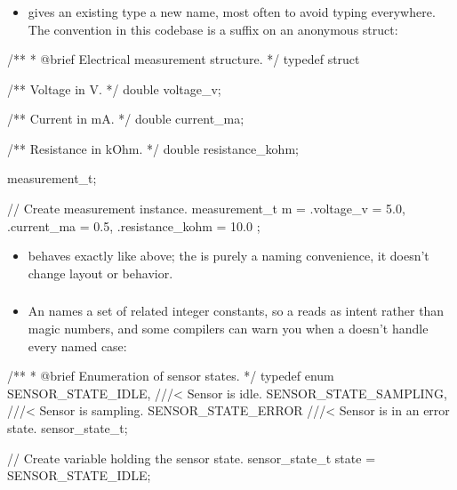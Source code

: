 \subsubsection{}
\begin{itemize}
  \item {} gives an existing type a new name, most often to avoid typing
     everywhere. The convention in this codebase is a  suffix on
    an anonymous struct:
\end{itemize}

\begin{ccode}
/**
 * @brief Electrical measurement structure.
 */
typedef struct
{
    /** Voltage in V. */
    double voltage_v;

    /** Current in mA. */
    double current_ma;

    /** Resistance in kOhm. */
    double resistance_kohm;
} measurement_t;

// Create measurement instance.
measurement_t m = { .voltage_v = 5.0, .current_ma = 0.5, .resistance_kohm = 10.0 };
\end{ccode}

\begin{itemize}
  \item {} behaves exactly like  above; the
     is purely a naming convenience, it doesn't change layout or behavior.
\end{itemize}

\subsubsection{}
\begin{itemize}
  \item An  names a set of related integer constants, so a  reads as intent
    rather than magic numbers, and some compilers can warn you when a  doesn't handle
    every named case:
\end{itemize}

\begin{ccode}
/**
 * @brief Enumeration of sensor states.
 */
typedef enum
{
    SENSOR_STATE_IDLE,     ///< Sensor is idle.
    SENSOR_STATE_SAMPLING, ///< Sensor is sampling.
    SENSOR_STATE_ERROR     ///< Sensor is in an error state.
} sensor_state_t;

// Create variable holding the sensor state.
sensor_state_t state = SENSOR_STATE_IDLE;
\end{ccode}

